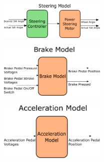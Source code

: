 \documentclass[letterpaper,12pt]{article}   %
\begin{document}
\begin{figure}[htb]
    \centering 
\begin{subfigure}{0.25\textwidth}
  \includegraphics[width=2in]{figs/inkscape/steeringModelArchitecture}
\end{subfigure}\hfill
\begin{subfigure}{0.25\textwidth}
  \includegraphics[width=2in]{figs/inkscape/brakeModelArchitecture}
\end{subfigure}\hfill
\begin{subfigure}{0.25\textwidth}
  \includegraphics[width=2in]{figs/inkscape/accelerationModelArchitecture}
\end{subfigure}


\end{figure}
\end{document}
